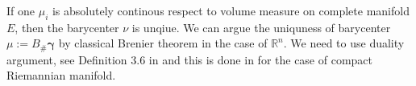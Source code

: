 \begin{rmk}
	If one $\mu_i$ is absolutely continous respect to volume measure on complete manifold $E$, then the barycenter $\nu$ is unqiue.
	We can argue the uniquness of barycenter $\mu:= B_{\#}\boldsymbol \gamma$ by classical Brenier theorem in the case of $\mathbb{R}^n$.
	We need to use duality argument, see Definition 3.6 in \cite{agueh2011barycenters} and this is done in \cite{kim2015multi} for the case of compact Riemannian manifold.
\end{rmk}
